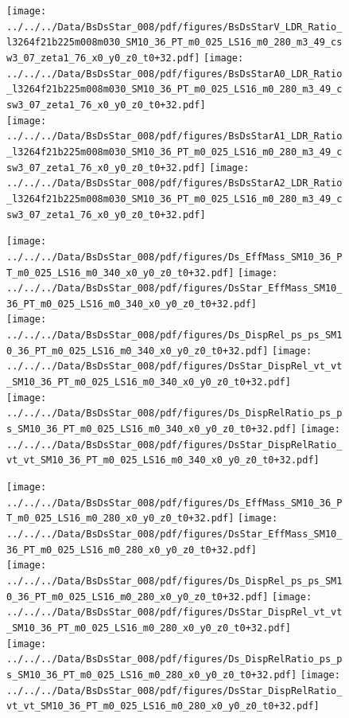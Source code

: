 \documentclass[a4paper,10pt]{article}
\begin{document}
\begin{figure}[p]
 \texttt{[image: ../../../Data/BsDsStar\_008/pdf/figures/BsDsStarV\_LDR\_Ratio\_l3264f21b225m008m030\_SM10\_36\_PT\_m0\_025\_LS16\_m0\_280\_m3\_49\_csw3\_07\_zeta1\_76\_x0\_y0\_z0\_t0+32.pdf]}  
\texttt{[image: ../../../Data/BsDsStar\_008/pdf/figures/BsDsStarA0\_LDR\_Ratio\_l3264f21b225m008m030\_SM10\_36\_PT\_m0\_025\_LS16\_m0\_280\_m3\_49\_csw3\_07\_zeta1\_76\_x0\_y0\_z0\_t0+32.pdf]} \\ 
\texttt{[image: ../../../Data/BsDsStar\_008/pdf/figures/BsDsStarA1\_LDR\_Ratio\_l3264f21b225m008m030\_SM10\_36\_PT\_m0\_025\_LS16\_m0\_280\_m3\_49\_csw3\_07\_zeta1\_76\_x0\_y0\_z0\_t0+32.pdf]}  
\texttt{[image: ../../../Data/BsDsStar\_008/pdf/figures/BsDsStarA2\_LDR\_Ratio\_l3264f21b225m008m030\_SM10\_36\_PT\_m0\_025\_LS16\_m0\_280\_m3\_49\_csw3\_07\_zeta1\_76\_x0\_y0\_z0\_t0+32.pdf]} \\ 
\end{figure} 
\clearpage

\begin{figure}[p]
 \texttt{[image: ../../../Data/BsDsStar\_008/pdf/figures/Ds\_EffMass\_SM10\_36\_PT\_m0\_025\_LS16\_m0\_340\_x0\_y0\_z0\_t0+32.pdf]}  
\texttt{[image: ../../../Data/BsDsStar\_008/pdf/figures/DsStar\_EffMass\_SM10\_36\_PT\_m0\_025\_LS16\_m0\_340\_x0\_y0\_z0\_t0+32.pdf]} \\ 
\texttt{[image: ../../../Data/BsDsStar\_008/pdf/figures/Ds\_DispRel\_ps\_ps\_SM10\_36\_PT\_m0\_025\_LS16\_m0\_340\_x0\_y0\_z0\_t0+32.pdf]}  
\texttt{[image: ../../../Data/BsDsStar\_008/pdf/figures/DsStar\_DispRel\_vt\_vt\_SM10\_36\_PT\_m0\_025\_LS16\_m0\_340\_x0\_y0\_z0\_t0+32.pdf]} \\ 
\texttt{[image: ../../../Data/BsDsStar\_008/pdf/figures/Ds\_DispRelRatio\_ps\_ps\_SM10\_36\_PT\_m0\_025\_LS16\_m0\_340\_x0\_y0\_z0\_t0+32.pdf]}  
\texttt{[image: ../../../Data/BsDsStar\_008/pdf/figures/DsStar\_DispRelRatio\_vt\_vt\_SM10\_36\_PT\_m0\_025\_LS16\_m0\_340\_x0\_y0\_z0\_t0+32.pdf]} \\ 
\end{figure} 
\clearpage

\begin{figure}[p]
 \texttt{[image: ../../../Data/BsDsStar\_008/pdf/figures/Ds\_EffMass\_SM10\_36\_PT\_m0\_025\_LS16\_m0\_280\_x0\_y0\_z0\_t0+32.pdf]}  
\texttt{[image: ../../../Data/BsDsStar\_008/pdf/figures/DsStar\_EffMass\_SM10\_36\_PT\_m0\_025\_LS16\_m0\_280\_x0\_y0\_z0\_t0+32.pdf]} \\ 
\texttt{[image: ../../../Data/BsDsStar\_008/pdf/figures/Ds\_DispRel\_ps\_ps\_SM10\_36\_PT\_m0\_025\_LS16\_m0\_280\_x0\_y0\_z0\_t0+32.pdf]}  
\texttt{[image: ../../../Data/BsDsStar\_008/pdf/figures/DsStar\_DispRel\_vt\_vt\_SM10\_36\_PT\_m0\_025\_LS16\_m0\_280\_x0\_y0\_z0\_t0+32.pdf]} \\ 
\texttt{[image: ../../../Data/BsDsStar\_008/pdf/figures/Ds\_DispRelRatio\_ps\_ps\_SM10\_36\_PT\_m0\_025\_LS16\_m0\_280\_x0\_y0\_z0\_t0+32.pdf]}  
\texttt{[image: ../../../Data/BsDsStar\_008/pdf/figures/DsStar\_DispRelRatio\_vt\_vt\_SM10\_36\_PT\_m0\_025\_LS16\_m0\_280\_x0\_y0\_z0\_t0+32.pdf]} \\ 
\end{figure} 
\clearpage
\end{document}
